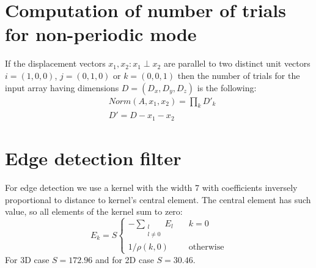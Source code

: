 \documentclass[1p]{elsarticle}
\begin{document}
\appendix
\section{Computation of number of trials for non-periodic mode}
\label{sec:number-of-trials}
If the displacement vectors $x_1, x_2: x_1 \perp x_2$ are parallel to two
distinct unit vectors $i=(1,0,0)$, $j=(0,1,0)$ or $k=(0,0,1)$ then the number of
trials for the input array having dimensions $D = (D_x, D_y, D_z)$ is the
following:
\begin{equation}
  \begin{aligned}
    & Norm(A, x_1, x_2) = \prod_k D'_k \\
    & D' = D - x_1 - x_2
  \end{aligned}
\end{equation}

\section{Edge detection filter}
\label{sec:filter}
For edge detection we use a kernel with the width 7 with coefficients inversely
proportional to distance to kernel's central element. The central element has
such value, so all elements of the kernel sum to zero:
\begin{equation}
  E_k = S \left\{
  \begin{array}{ll}
    -\sum\limits_{\substack{l \\ l \ne 0}} E_l & \quad k = 0 \\
    1 / \rho(k, 0) & \quad \text{otherwise}
  \end{array}
  \right.
\end{equation}
For 3D case $S=172.96$ and for 2D case $S=30.46$.


\end{document}
